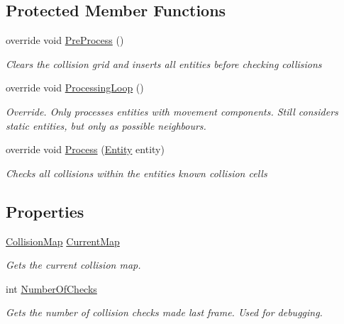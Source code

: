\subsection*{Protected Member Functions}
\begin{DoxyCompactItemize}
\item 
override void \hyperlink{class_midnight_blue_1_1_engine_1_1_entity_component_1_1_collision_system_ab85ff8fd81369e705c461f58014f5ec2}{Pre\+Process} ()
\begin{DoxyCompactList}\small\item\em Clears the collision grid and inserts all entities before checking collisions \end{DoxyCompactList}\item 
override void \hyperlink{class_midnight_blue_1_1_engine_1_1_entity_component_1_1_collision_system_a31ce790a36d5948868df3fd352338194}{Processing\+Loop} ()
\begin{DoxyCompactList}\small\item\em Override. Only processes entities with movement components. Still considers static entities, but only as possible neighbours. \end{DoxyCompactList}\item 
override void \hyperlink{class_midnight_blue_1_1_engine_1_1_entity_component_1_1_collision_system_a0fe9a2023d5fabc7861b50abfc607def}{Process} (\hyperlink{class_midnight_blue_1_1_engine_1_1_entity_component_1_1_entity}{Entity} entity)
\begin{DoxyCompactList}\small\item\em Checks all collisions within the entities known collision cells \end{DoxyCompactList}\end{DoxyCompactItemize}
\subsection*{Properties}
\begin{DoxyCompactItemize}
\item 
\hyperlink{class_midnight_blue_1_1_engine_1_1_collision_1_1_collision_map}{Collision\+Map} \hyperlink{class_midnight_blue_1_1_engine_1_1_entity_component_1_1_collision_system_a7467afd10338c1c475442d49d3ba0652}{Current\+Map}
\begin{DoxyCompactList}\small\item\em Gets the current collision map. \end{DoxyCompactList}\item 
int \hyperlink{class_midnight_blue_1_1_engine_1_1_entity_component_1_1_collision_system_a0375b2432a276123371e5616c51df971}{Number\+Of\+Checks}
\begin{DoxyCompactList}\small\item\em Gets the number of collision checks made last frame. Used for debugging. \end{DoxyCompactList}\end{DoxyCompactItemize}
